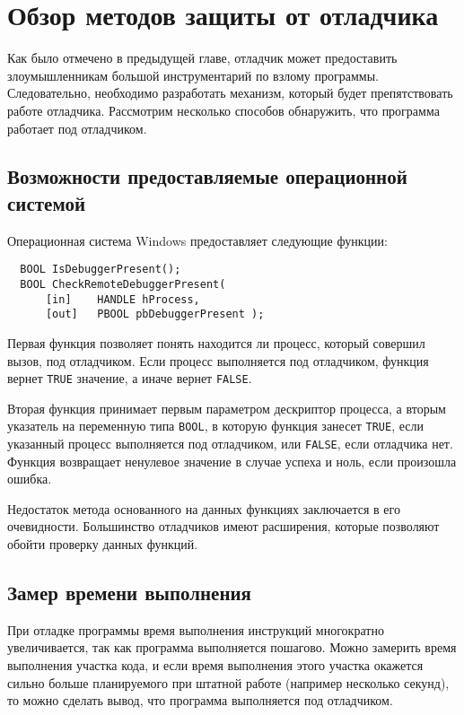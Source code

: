 
\section{Обзор методов защиты от отладчика}
Как было отмечено в предыдущей главе, отладчик может предоставить
злоумышленникам большой инструментарий по взлому программы. Следовательно,
необходимо разработать механизм, который будет препятствовать работе отладчика.
Рассмотрим несколько способов обнаружить, что программа работает под отладчиком.

\subsection{Возможности предоставляемые операционной системой}
Операционная система Windows предоставляет следующие функции:
\begin{verbatim}
  BOOL IsDebuggerPresent();
  BOOL CheckRemoteDebuggerPresent(
      [in]    HANDLE hProcess,
      [out]   PBOOL pbDebuggerPresent );
\end{verbatim}

Первая функция позволяет понять находится ли процесс, который совершил вызов,
под отладчиком. Если процесс выполняется под отладчиком, функция вернет
\verb!TRUE! значение, а иначе вернет \verb!FALSE!.

Вторая функция принимает первым параметром дескриптор процесса, а вторым
указатель на переменную типа \verb!BOOL!, в которую функция занесет \verb!TRUE!,
если указанный процесс выполняется под отладчиком, или \verb!FALSE!, если
отладчика нет. Функция возвращает ненулевое значение в случае успеха и ноль,
если произошла ошибка.

Недостаток метода основанного на данных функциях заключается в его очевидности.
Большинство отладчиков имеют расширения, которые позволяют обойти проверку
данных функций.

\subsection{Замер времени выполнения}
При отладке программы время выполнения инструкций многократно увеличивается, так
как программа выполняется пошагово. Можно замерить время выполнения участка
кода, и если время выполнения этого участка окажется сильно больше планируемого
при штатной работе (например несколько секунд), то можно сделать вывод, что
программа выполняется под отладчиком.

